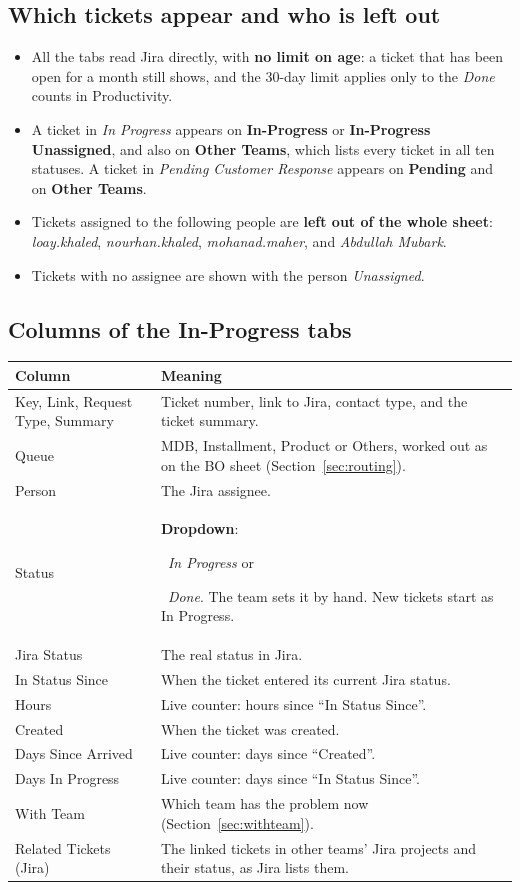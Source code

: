 \documentclass[11pt,a4paper]{article}
\newcommand{\tab}[1]{\textbf{#1}}
\newcommand{\swatch}[1]{\colorbox{#1}{\rule{0pt}{1.6ex}\hspace{1.4em}}}
\let\oldsubsection\subsection
\renewcommand{\subsection}{\needspace{7\baselineskip}\oldsubsection}
\begin{document}
\subsection{Which tickets appear and who is left out}
\label{sec:excluded}
\begin{itemize}
  \item All the tabs read Jira directly, with \textbf{no limit on age}: a ticket that has been open for a month still
    shows, and the 30-day limit applies only to the \emph{Done} counts in Productivity.
  \item A ticket in \emph{In Progress} appears on \tab{In-Progress} or \tab{In-Progress Unassigned}, and also on
    \tab{Other Teams}, which lists every ticket in all ten statuses. A ticket in \emph{Pending Customer Response}
    appears on \tab{Pending} and on \tab{Other Teams}.
  \item Tickets assigned to the following people are \textbf{left out of the whole sheet}: \emph{loay.khaled},
    \emph{nourhan.khaled}, \emph{mohanad.maher}, and \emph{Abdullah Mubark}.
  \item Tickets with no assignee are shown with the person \emph{Unassigned}.
\end{itemize}

\subsection{Columns of the In-Progress tabs}
\begin{tabularx}{\linewidth}{@{}l L@{}}
\toprule
\textbf{Column} & \textbf{Meaning} \\
\midrule
Key, Link, Request Type, Summary & Ticket number, link to Jira, contact type, and the ticket summary. \\
Queue & MDB, Installment, Product or Others, worked out as on the BO sheet (Section~\ref{sec:routing}). \\
Person & The Jira assignee. \\
Status & \textbf{Dropdown}: \swatch{sheetblue}~\emph{In Progress} or \swatch{sheetgreen}~\emph{Done}. The
team sets it by hand. New tickets start as In Progress. \\
Jira Status & The real status in Jira. \\
In Status Since & When the ticket entered its current Jira status. \\
Hours & Live counter: hours since ``In Status Since''. \\
Created & When the ticket was created. \\
Days Since Arrived & Live counter: days since ``Created''. \\
Days In Progress & Live counter: days since ``In Status Since''. \\
With Team & Which team has the problem now (Section~\ref{sec:withteam}). \\
Related Tickets (Jira) & The linked tickets in other teams' Jira projects and their status, as Jira lists them. \\
\bottomrule
\end{tabularx}
\end{document}
